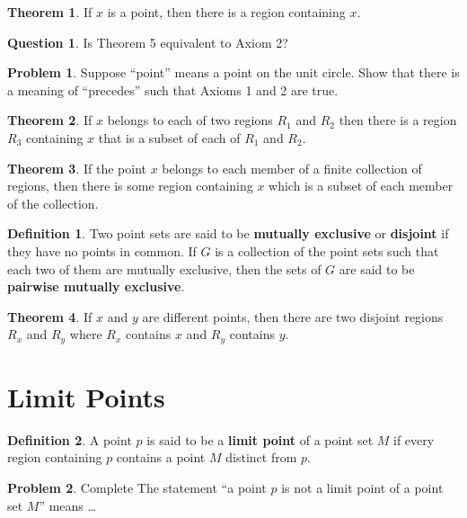 \documentclass{article}
\theoremstyle{definition}
\newtheorem{definition}{Definition}
\newtheorem{question}{Question}
\newtheorem{theorem}{Theorem}
\theoremstyle{definition}
\newtheorem{problem}{Problem}
\theoremstyle{plain}
\begin{document}
\begin{theorem}
  If $x$ is a point, then there is a region containing $x$.
\end{theorem}

\begin{question}
  Is Theorem 5 equivalent to Axiom 2?
\end{question}

\begin{problem}
  Suppose ``point'' means a point on the unit circle.  Show that there is a
  meaning of ``precedes'' such that Axioms 1 and 2 are true.
\end{problem}

\begin{theorem}
  If $x$ belongs to each of two regions $R_1$ and $R_2$ then there is a region
  $R_3$ containing $x$ that is a subset of each of $R_1$ and $R_2$.
\end{theorem}

\begin{theorem}
  If the point $x$ belongs to each member of a finite collection of regions,
  then there is some region containing $x$ which is a subset of each member of
  the collection.
\end{theorem}

\begin{definition}
  Two point sets are said to be \textbf{mutually exclusive} or
  \textbf{disjoint} if they have no points in common.  If $G$ is a collection
  of the point sets such that each two of them are mutually exclusive, then the
  sets of $G$ are said to be \textbf{pairwise mutually exclusive}.
\end{definition}

\begin{theorem}
  If $x$ and $y$ are different points, then there are two disjoint regions
  $R_x$ and $R_y$ where $R_x$ contains $x$ and $R_y$ contains $y$.
\end{theorem}

\section*{Limit Points}

\begin{definition} 
  A point $p$ is said to be a \textbf{limit point} of a point set $M$ if every
  region containing $p$ contains a point $M$ distinct from $p$.
\end{definition}

\begin{problem}
  Complete The statement ``a point $p$ is not a limit point of a point set
  $M$'' means \ldots
\end{problem}
\end{document}
